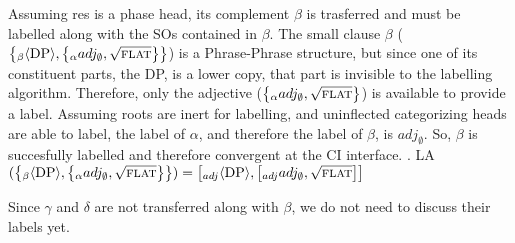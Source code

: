\documentclass[MilwayThesis]{subfiles}
\begin{document}
Assuming res is a phase head, its complement $\beta$ is trasferred and must be labelled along with the SOs contained in $\beta$.
The small clause $\beta$ ($\left\{_\beta \langle \text{DP}\rangle, \left\{_\alpha adj_\emptyset, \sqrt{\textsc{flat}} \right\} \right\}$) is a Phrase-Phrase structure, but since one of its constituent parts, the DP, is a lower copy, that part is invisible to the labelling algorithm.
Therefore, only the adjective ($\left\{_\alpha adj_\emptyset, \sqrt{\textsc{flat}} \right\}$) is available to provide a label.
Assuming roots are inert for labelling, and uninflected categorizing heads are able to label, the label of $\alpha$, and therefore the label of $\beta$, is $adj_\emptyset$.
So, $\beta$ is succesfully labelled and therefore convergent at the CI interface.
\ex. LA$(\left\{_\beta \langle\text{DP}\rangle, \left\{_\alpha adj_\emptyset, \sqrt{\textsc{flat}} \right\} \right\}) = \left[_{adj} \langle\text{DP}\rangle, \left[_{adj} adj_\emptyset, \sqrt{\textsc{flat}} \right]  \right]$

Since $\gamma$ and $\delta$ are not transferred along with $\beta$, we do not need to discuss their labels yet.
\end{document}
